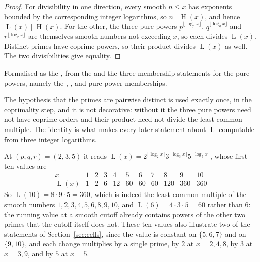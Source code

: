 \documentclass[11pt]{article}
\newcommand{\hgt}{\operatorname{H}}
\newcommand{\Lprefix}{\operatorname{L}}
\begin{document}
\begin{proof}
For divisibility in one direction, every smooth $n\le x$ has exponents bounded
by the corresponding integer logarithms, so $n\mid\hgt(x)$, and hence
$\Lprefix(x)\mid\hgt(x)$.  For the other, the three pure powers
$p^{\lfloor\log_p x\rfloor}$, $q^{\lfloor\log_q x\rfloor}$ and
$r^{\lfloor\log_r x\rfloor}$ are themselves smooth numbers not exceeding $x$,
so each divides $\Lprefix(x)$.  Distinct primes have coprime powers, so their
product divides $\Lprefix(x)$ as well.  The two divisibilities give equality.
\end{proof}

\noindent Formalised as the
, from the
 and the three membership statements for the pure powers,
namely the
,
,
and
pure-power memberships.

The hypothesis that the primes are pairwise distinct is used exactly once, in
the coprimality step, and it is not decorative: without it the three pure
powers need not have coprime orders and their product need not divide the least
common multiple.  The identity is what makes every later statement about
$\Lprefix$ computable from three integer logarithms.

At $(p,q,r)=(2,3,5)$ it reads
$\Lprefix(x)=2^{\lfloor\log_2 x\rfloor}3^{\lfloor\log_3 x\rfloor}
5^{\lfloor\log_5 x\rfloor}$, whose first ten values are
\[
\begin{array}{c|cccccccccc}
x&1&2&3&4&5&6&7&8&9&10\\ \hline
\Lprefix(x)&1&2&6&12&60&60&60&120&360&360
\end{array}
\]
So $\Lprefix(10)=8\cdot9\cdot5=360$, which is indeed the least common multiple
of the smooth numbers $1,2,3,4,5,6,8,9,10$, and $\Lprefix(6)=4\cdot3\cdot5=60$
rather than $6$: the running value at a smooth cutoff already contains powers of
the other two primes that the cutoff itself does not.  These ten values also
illustrate two of the statements of Section~\ref{sec:cells}, since the value is
constant on $\{5,6,7\}$ and on $\{9,10\}$, and each change multiplies by a
single prime, by $2$ at $x=2,4,8$, by $3$ at $x=3,9$, and by $5$ at $x=5$.
\end{document}
